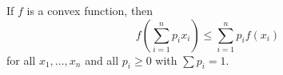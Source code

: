 If $f$ is a convex function, then
$$f\left(\sum_{i=1}^{n} p_i x_i\right) \leq \sum_{i=1}^{n} p_i f(x_i)$$
for all $x_1, \ldots, x_n$ and all $p_i \geq 0$ with $\sum p_i = 1$.
